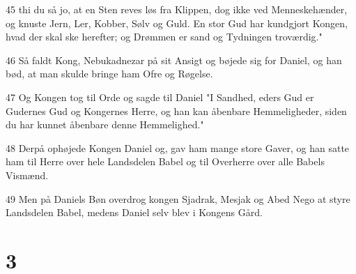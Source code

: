 \par 45 thi du så jo, at en Sten reves løs fra Klippen, dog ikke ved Menneskehænder, og knuste Jern, Ler, Kobber, Sølv og Guld. En stor Gud har kundgjort Kongen, hvad der skal ske herefter; og Drømmen er sand og Tydningen troværdig."
\par 46 Så faldt Kong, Nebukadnezar på sit Ansigt og bøjede sig for Daniel, og han bød, at man skulde bringe ham Ofre og Røgelse.
\par 47 Og Kongen tog til Orde og sagde til Daniel "I Sandhed, eders Gud er Gudernes Gud og Kongernes Herre, og han kan åbenbare Hemmeligheder, siden du har kunnet åbenbare denne Hemmelighed."
\par 48 Derpå ophøjede Kongen Daniel og, gav ham mange store Gaver, og han satte ham til Herre over hele Landsdelen Babel og til Overherre over alle Babels Vismænd.
\par 49 Men på Daniels Bøn overdrog kongen Sjadrak, Mesjak og Abed Nego at styre Landsdelen Babel, medens Daniel selv blev i Kongens Gård.

\chapter{3}

